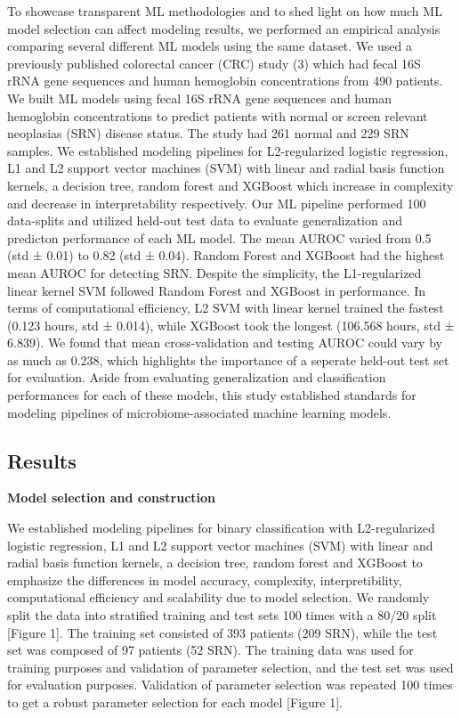 \documentclass[11pt,]{article}
\begin{document}
To showcase transparent ML methodologies and to shed light on how much
ML model selection can affect modeling results, we performed an
empirical analysis comparing several different ML models using the same
dataset. We used a previously published colorectal cancer (CRC) study
(3) which had fecal 16S rRNA gene sequences and human hemoglobin
concentrations from 490 patients. We built ML models using fecal 16S
rRNA gene sequences and human hemoglobin concentrations to predict
patients with normal or screen relevant neoplasias (SRN) disease status.
The study had 261 normal and 229 SRN samples. We established modeling
pipelines for L2-regularized logistic regression, L1 and L2 support
vector machines (SVM) with linear and radial basis function kernels, a
decision tree, random forest and XGBoost which increase in complexity
and decrease in interpretability respectively. Our ML pipeline performed
100 data-splits and utilized held-out test data to evaluate
generalization and predicton performance of each ML model. The mean
AUROC varied from 0.5 (std ± 0.01) to 0.82 (std ± 0.04). Random Forest
and XGBoost had the highest mean AUROC for detecting SRN. Despite the
simplicity, the L1-regularized linear kernel SVM followed Random Forest
and XGBoost in performance. In terms of computational efficiency, L2 SVM
with linear kernel trained the fastest (0.123 hours, std ± 0.014), while
XGBoost took the longest (106.568 hours, std ± 6.839). We found that
mean cross-validation and testing AUROC could vary by as much as 0.238,
which highlights the importance of a seperate held-out test set for
evaluation. Aside from evaluating generalization and classification
performances for each of these models, this study established standards
for modeling pipelines of microbiome-associated machine learning models.

\subsection{Results}\label{results}

\textbf{Model selection and construction}

We established modeling pipelines for binary classification with
L2-regularized logistic regression, L1 and L2 support vector machines
(SVM) with linear and radial basis function kernels, a decision tree,
random forest and XGBoost to emphasize the differences in model
accuracy, complexity, interpretibility, computational efficiency and
scalability due to model selection. We randomly split the data into
stratified training and test sets 100 times with a 80/20 split {[}Figure
1{]}. The training set consisted of 393 patients (209 SRN), while the
test set was composed of 97 patients (52 SRN). The training data was
used for training purposes and validation of parameter selection, and
the test set was used for evaluation purposes. Validation of parameter
selection was repeated 100 times to get a robust parameter selection for
each model {[}Figure 1{]}.
\end{document}
